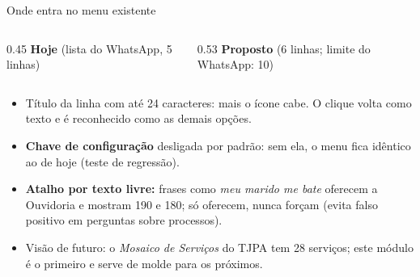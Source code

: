 \documentclass[aspectratio=169,10pt]{beamer}
\newcommand{\code}[1]{\texttt{\detokenize{#1}}}
\begin{document}
\begin{frame}{Onde entra no menu existente}
\begin{columns}[T]
\begin{column}{0.45\textwidth}
\textbf{Hoje} (lista do WhatsApp, 5 linhas)
\vskip3pt
\end{column}
\begin{column}{0.53\textwidth}
\textbf{Proposto} (6 linhas; limite do WhatsApp: 10)
\vskip3pt
\end{column}
\end{columns}
\vskip6pt
\begin{itemize}\small\setlength\itemsep{3pt}
  \item Título da linha com até 24 caracteres: \code{Ouvidoria da Mulher} mais o ícone cabe. O clique volta como texto e é reconhecido como as demais opções.
  \item \textbf{Chave de configuração} desligada por padrão: sem ela, o menu fica idêntico ao de hoje (teste de regressão).
  \item \textbf{Atalho por texto livre:} frases como \emph{meu marido me bate} oferecem a Ouvidoria e mostram 190 e 180; \alert{só oferecem, nunca forçam} (evita falso positivo em perguntas sobre processos).
  \item Visão de futuro: o \emph{Mosaico de Serviços} do TJPA tem 28 serviços; este módulo é o primeiro e serve de molde para os próximos.
\end{itemize}
\end{frame}
\end{document}
